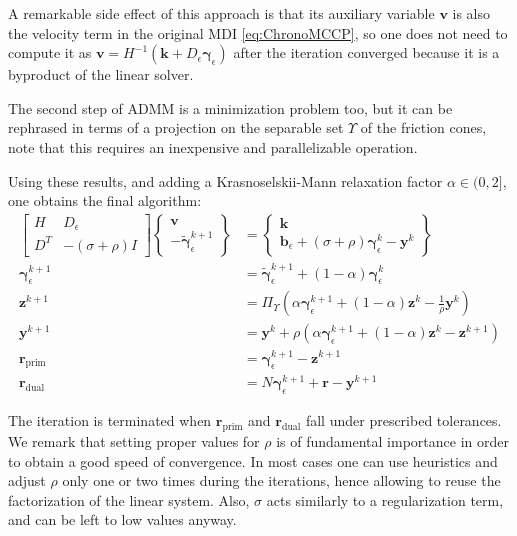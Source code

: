 \documentclass{svproc}
\newcommand{\vect}[1]{\bm{#1}}
\begin{document}
A remarkable side effect of this approach is that its auxiliary variable $\vect{v}$ is also the velocity term in the original MDI 
\eqref{eq:ChronoMCCP}, so one does not need to compute it as $\vect{v}=H^{-1}(\vect{k} + D_\epsilon \vect{\gamma}_\epsilon )$ after the iteration converged because it is a byproduct of the linear solver.

The second step of ADMM is a minimization problem too, but it can be rephrased in terms of a projection on the separable set $\Upsilon$ of the friction cones, note that this requires an inexpensive and parallelizable operation. 

Using these results, and adding a Krasnoselskii-Mann relaxation factor $\alpha \in(0,2]$, one obtains the final algorithm:
%
\begin{subequations}
	\begin{align}
    \begin{bmatrix}
		 H   & D_\epsilon \\
		 D^T & -(\sigma+\rho) I
		\end{bmatrix}
		\begin{Bmatrix}
		 \vect{v}    \\
		 -\tilde{\vect{\gamma}}_\epsilon^{k+1}
		\end{Bmatrix}
		&=
		\begin{Bmatrix}
		 \vect{k} \\
		 \vect{b}_\epsilon + (\sigma+\rho) \vect{\gamma}_\epsilon^k-\vect{y}^k 
		\end{Bmatrix}
		\\
		\vect{\gamma}^{k+1}_\epsilon &=\tilde{\vect{\gamma}}_\epsilon^{k+1} + (1-\alpha) \vect{\gamma}_\epsilon^k \\
		\vect{z}^{k+1} &= \Pi_\Upsilon \left( \alpha \vect{\gamma}_\epsilon^{k+1} + (1-\alpha) \vect{z}^k  - \frac{1}{\rho} \vect{y}^k \right) \\
		\vect{y}^{k+1} &= \vect{y}^k + \rho \left( \alpha \vect{\gamma}_\epsilon^{k+1} + (1-\alpha) \vect{z}^k - \vect{z}^{k+1} \right) \\
		\vect{r}_{\text{prim}} &= \vect{\gamma}_\epsilon^{k+1}-\vect{z}^{k+1} \\
		\vect{r}_{\text{dual}} &= N \vect{\gamma}_\epsilon^{k+1}+\vect{r}-\vect{y}^{k+1} 
	\end{align}
	\label{eq:admm_final}
\end{subequations}

The iteration is terminated when $\vect{r}_{\text{prim}}$ and $\vect{r}_{\text{dual}}$ fall under prescribed tolerances. We remark that setting proper values for $\rho$ is of fundamental importance in order to obtain a good speed of convergence. In most cases one can use heuristics and adjust $\rho$ only one or two times during the iterations, hence allowing to reuse the factorization of the linear system. Also, $\sigma$ acts similarly to a regularization term, and can be left to low values anyway.
\end{document}
